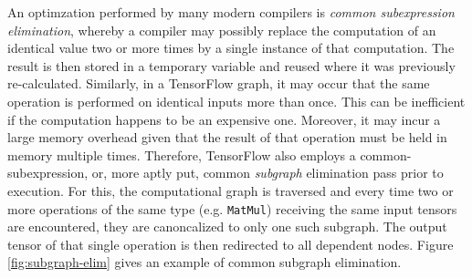 An optimzation performed by many modern compilers is \emph{common subexpression
  elimination}, whereby a compiler may possibly replace the computation of an
identical value two or more times by a single instance of that computation. The
result is then stored in a temporary variable and reused where it was previously
re-calculated. Similarly, in a TensorFlow graph, it may occur that the same
operation is performed on identical inputs more than once. This can be
inefficient if the computation happens to be an expensive one. Moreover, it may
incur a large memory overhead given that the result of that operation must be
held in memory multiple times. Therefore, TensorFlow also employs a
common-subexpression, or, more aptly put, common \emph{subgraph} elimination
pass prior to execution. For this, the computational graph is traversed and
every time two or more operations of the same type (e.g. \texttt{MatMul})
receiving the same input tensors are encountered, they are canoncalized to only
one such subgraph. The output tensor of that single operation is then redirected
to all dependent nodes. Figure \ref{fig:subgraph-elim} gives an example of
common subgraph elimination.

